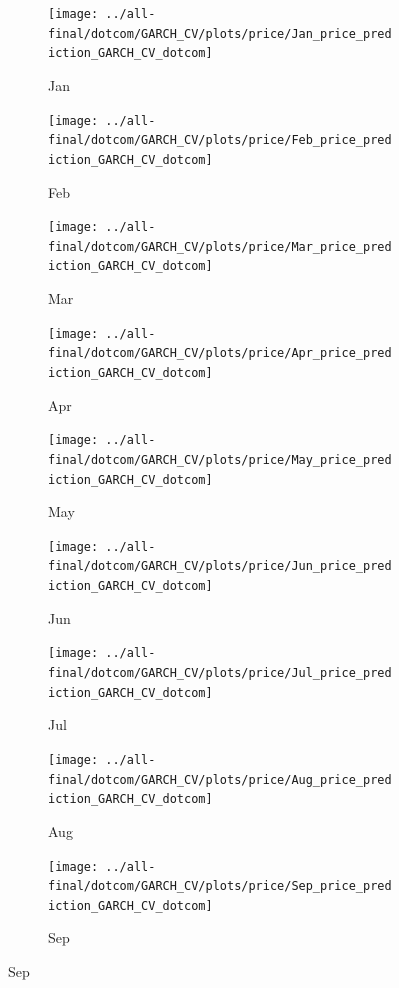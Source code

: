 \documentclass[ngerman]{ttlab-qualify}
\begin{document}
\begin{figure}[H]
\centering
  \begin{subfigure}{.3\linewidth}
  \texttt{[image: ../all-final/dotcom/GARCH\_CV/plots/price/Jan\_price\_prediction\_GARCH\_CV\_dotcom]}\hfill
  \caption{Jan}
  \end{subfigure}
  \begin{subfigure}{.3\linewidth}
  \texttt{[image: ../all-final/dotcom/GARCH\_CV/plots/price/Feb\_price\_prediction\_GARCH\_CV\_dotcom]}\hfill
  \caption{Feb}
  \end{subfigure}
  \begin{subfigure}{.3\linewidth}
  \texttt{[image: ../all-final/dotcom/GARCH\_CV/plots/price/Mar\_price\_prediction\_GARCH\_CV\_dotcom]}\hfill
  \caption{Mar}
  \end{subfigure}\par\medskip
  \begin{subfigure}{.3\linewidth}
  \texttt{[image: ../all-final/dotcom/GARCH\_CV/plots/price/Apr\_price\_prediction\_GARCH\_CV\_dotcom]}\hfill
  \caption{Apr}
  \end{subfigure}
  \begin{subfigure}{.3\linewidth}
  \texttt{[image: ../all-final/dotcom/GARCH\_CV/plots/price/May\_price\_prediction\_GARCH\_CV\_dotcom]}\hfill
  \caption{May}
  \end{subfigure}
  \begin{subfigure}{.3\linewidth}
  \texttt{[image: ../all-final/dotcom/GARCH\_CV/plots/price/Jun\_price\_prediction\_GARCH\_CV\_dotcom]}\hfill
  \caption{Jun}
  \end{subfigure}\par\medskip
  \begin{subfigure}{.3\linewidth}
  \texttt{[image: ../all-final/dotcom/GARCH\_CV/plots/price/Jul\_price\_prediction\_GARCH\_CV\_dotcom]}\hfill
  \caption{Jul}
  \end{subfigure}
  \begin{subfigure}{.3\linewidth}
  \texttt{[image: ../all-final/dotcom/GARCH\_CV/plots/price/Aug\_price\_prediction\_GARCH\_CV\_dotcom]}\hfill
  \caption{Aug}
  \end{subfigure}
  \begin{subfigure}{.3\linewidth}
  \texttt{[image: ../all-final/dotcom/GARCH\_CV/plots/price/Sep\_price\_prediction\_GARCH\_CV\_dotcom]}\hfill
  \caption{Sep}
  \end{subfigure}\par\medskip

\end{figure}
\end{document}
